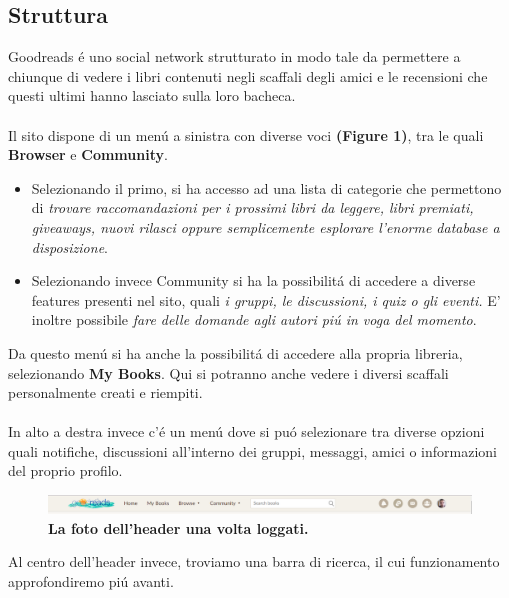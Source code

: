 \documentclass[12pt]{article}
\begin{document}
\subsection{Struttura}
Goodreads \'e uno social network strutturato in modo tale da permettere a chiunque di vedere i libri contenuti negli scaffali degli amici e le recensioni che questi ultimi hanno lasciato sulla loro bacheca.\\
\\Il sito dispone di un men\'u a sinistra con diverse voci \textbf{(Figure 1)}, tra le quali \textbf{Browser} e \textbf{Community}.
\begin{itemize}
\item Selezionando il primo, si ha accesso ad una lista di categorie che permettono di \textit{trovare raccomandazioni per i prossimi libri da leggere, libri premiati, giveaways, nuovi rilasci oppure semplicemente esplorare l'enorme database a disposizione}.
\item Selezionando invece Community si ha la possibilit\'a di accedere a diverse features presenti nel sito, quali\textit{ i gruppi, le discussioni, i quiz o gli eventi.} E' inoltre possibile \textit{fare delle domande agli autori pi\'u in voga del momento}.
\end{itemize}
Da questo men\'u si ha anche la possibilit\'a di accedere alla propria libreria, selezionando \textbf{My Books}. Qui si potranno anche vedere i diversi scaffali personalmente creati e riempiti. \\ \\
In alto a destra invece c'\'e un men\'u dove si pu\'o selezionare tra diverse opzioni quali notifiche, discussioni all'interno dei gruppi, messaggi, amici o informazioni del proprio profilo.
\begin{figure}
	\centering 
	\includegraphics[width=16.5cm]{resources/headerbar.png}
	\caption{\textbf{La foto dell'header una volta loggati.}}
\end{figure}
Al centro dell'header invece, troviamo una barra di ricerca, il cui funzionamento approfondiremo pi\'u avanti.
\newpage
\end{document}
